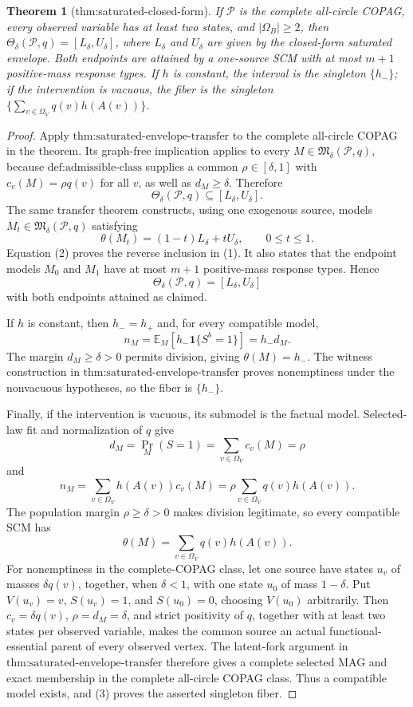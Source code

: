 \documentclass{article}
\newtheorem{theorem}{Theorem}
\begin{document}
\begin{theorem}[thm:saturated-closed-form]\label{thm:saturated-closed-form}
If \(\mathcal P\) is the complete all-circle COPAG, every observed variable has at least two states, and \(|\Omega_B|\ge2\), then \(\Theta_\delta(\mathcal P,q)=[L_\delta,U_\delta]\), where \(L_\delta\) and \(U_\delta\) are given by the closed-form saturated envelope. Both endpoints are attained by a one-source SCM with at most \(m+1\) positive-mass response types. If \(h\) is constant, the interval is the singleton \(\{h_-\}\); if the intervention is vacuous, the fiber is the singleton \(\{\sum_{v\in\Omega_V}q(v)h(A(v))\}\).
\end{theorem}
\begin{proof}
Apply \(\text{thm:saturated-envelope-transfer}\) to the complete all-circle COPAG in the theorem.  Its graph-free implication applies to every \(M\in\mathfrak M_\delta(\mathcal P,q)\), because \(\text{def:admissible-class}\) supplies a common \(\rho\in[\delta,1]\) with \(c_v(M)=\rho q(v)\) for all \(v\), as well as \(d_M\geq\delta\).  Therefore
\[
\Theta_\delta(\mathcal P,q)\subseteq[L_\delta,U_\delta]. \tag{1}
\]
The same transfer theorem constructs, using one exogenous source, models \(M_t\in\mathfrak M_\delta(\mathcal P,q)\) satisfying
\[
\theta(M_t)=(1-t)L_\delta+tU_\delta,
\qquad 0\leq t\leq1. \tag{2}
\]
Equation (2) proves the reverse inclusion in (1).  It also states that the endpoint models \(M_0\) and \(M_1\) have at most \(m+1\) positive-mass response types.  Hence
\[
\Theta_\delta(\mathcal P,q)=[L_\delta,U_\delta]
\]
with both endpoints attained as claimed.

If \(h\) is constant, then \(h_-=h_+\) and, for every compatible model,
\[
n_M=\mathbb E_M\!\left[h_-\mathbf 1\{S^b=1\}\right]=h_-d_M.
\]
The margin \(d_M\geq\delta>0\) permits division, giving \(\theta(M)=h_-\).  The witness construction in \(\text{thm:saturated-envelope-transfer}\) proves nonemptiness under the nonvacuous hypotheses, so the fiber is \(\{h_-\}\).

Finally, if the intervention is vacuous, its submodel is the factual model.  Selected-law fit and normalization of \(q\) give
\[
d_M=\Pr_M(S=1)=\sum_{v\in\Omega_V}c_v(M)=\rho
\]
and
\[
n_M=\sum_{v\in\Omega_V}h(A(v))c_v(M)
=\rho\sum_{v\in\Omega_V}q(v)h(A(v)).
\]
The population margin \(\rho\geq\delta>0\) makes division legitimate, so every compatible SCM has
\[
\theta(M)=\sum_{v\in\Omega_V}q(v)h(A(v)). \tag{3}
\]
For nonemptiness in the complete-COPAG class, let one source have states \(u_v\) of masses \(\delta q(v)\), together, when \(\delta<1\), with one state \(u_0\) of mass \(1-\delta\).  Put \(V(u_v)=v\), \(S(u_v)=1\), and \(S(u_0)=0\), choosing \(V(u_0)\) arbitrarily.  Then \(c_v=\delta q(v)\), \(\rho=d_M=\delta\), and strict positivity of \(q\), together with at least two states per observed variable, makes the common source an actual functional-essential parent of every observed vertex.  The latent-fork argument in \(\text{thm:saturated-envelope-transfer}\) therefore gives a complete selected MAG and exact membership in the complete all-circle COPAG class.  Thus a compatible model exists, and (3) proves the asserted singleton fiber.
\end{proof}
\end{document}
